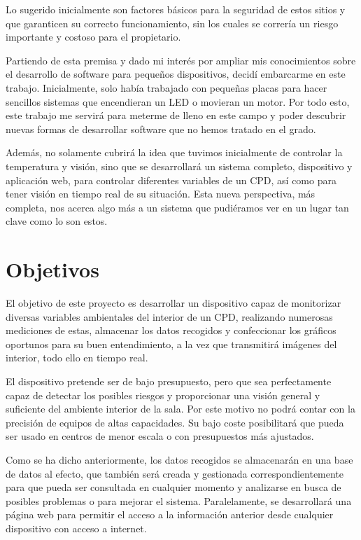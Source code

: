 Lo sugerido inicialmente son factores básicos para la seguridad de estos sitios y que garanticen su correcto funcionamiento, sin los cuales se correría un riesgo importante y costoso para el propietario.

Partiendo de esta premisa y dado mi interés por ampliar mis conocimientos sobre el desarrollo de software para pequeños dispositivos, decidí embarcarme en este trabajo. Inicialmente, solo había trabajado con pequeñas placas para hacer sencillos sistemas que encendieran un LED o movieran un motor. Por todo esto, este trabajo me servirá para meterme de lleno en este campo y poder descubrir nuevas formas de desarrollar software que no hemos tratado en el grado.

Además, no solamente cubrirá la idea que tuvimos inicialmente de controlar la temperatura y visión, sino que se desarrollará un sistema completo, dispositivo y aplicación web, para controlar diferentes variables de un CPD, así como para tener visión en tiempo real de su situación. Esta nueva perspectiva, más completa, nos acerca algo más a un sistema que pudiéramos ver en un lugar tan clave como lo son estos.

\section{Objetivos}\label{sec:objetivos}
El objetivo de este proyecto es desarrollar un dispositivo capaz de monitorizar diversas variables ambientales del interior de un CPD, realizando numerosas mediciones de estas, almacenar los datos recogidos y confeccionar los gráficos oportunos para su buen entendimiento, a la vez que transmitirá imágenes del interior, todo ello en tiempo real.

El dispositivo pretende ser de bajo presupuesto, pero que sea perfectamente capaz de detectar los posibles riesgos y proporcionar una visión general y suficiente del ambiente interior de la sala. Por este motivo no podrá contar con la precisión de equipos de altas capacidades. Su bajo coste posibilitará que pueda ser usado en centros de menor escala o con presupuestos más ajustados.

Como se ha dicho anteriormente, los datos recogidos se almacenarán en una base de datos al efecto, que también será creada y gestionada correspondientemente para que pueda ser consultada en cualquier momento y analizarse en busca de posibles problemas o para mejorar el sistema. Paralelamente, se desarrollará una página web para permitir el acceso a la información anterior desde cualquier dispositivo con acceso a internet.

